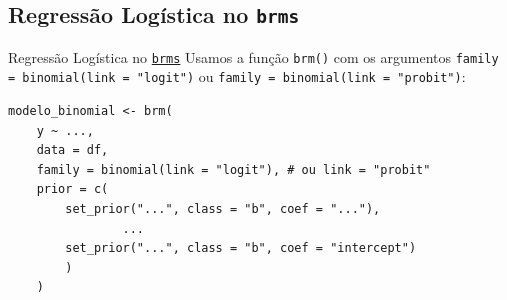 \subsection{Regressão Logística no \texttt{brms}}
\begin{frame}[fragile]{Regressão Logística no \href{https://paul-buerkner.github.io/brms/}{\texttt{brms}}}
    Usamos a função \texttt{brm()} com os argumentos \texttt{family = binomial(link = "logit")} ou
    \texttt{family = binomial(link = "probit")}:
    \vfill
    \begin{lstlisting}[basicstyle=\small]
    modelo_binomial <- brm(
    y ~ ...,
    data = df,
    family = binomial(link = "logit"), # ou link = "probit"
    prior = c(
        set_prior("...", class = "b", coef = "..."),
                ...
        set_prior("...", class = "b", coef = "intercept")
        )
    )
    \end{lstlisting}
\end{frame}
